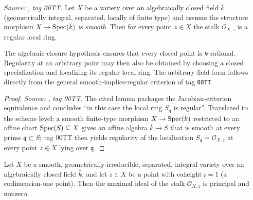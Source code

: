 \begin{lemma}\label{mk-lem:smooth_to_regular_local_ring}
  \leanok

  \textit{Source: \cite{stacks-project}, tag 00TT.}
  Let \(X\) be a variety over an algebraically closed field \(\bar k\) (geometrically
  integral, separated, locally of finite type) and assume the structure morphism
  \(X \to \operatorname{Spec}(\bar k)\) is \emph{smooth}. Then for every point \(z \in X\) the
  stalk \(\mathcal O_{X, z}\) is a regular local ring.

  The algebraic-closure hypothesis ensures that every closed point is
  \(\bar k\)-rational. Regularity at an arbitrary point may then also be obtained by
  choosing a closed specialization and localizing its regular local ring. The
  arbitrary-field form follows directly from the general smooth-implies-regular
  criterion of tag \texttt{00TT}.
\end{lemma}

\begin{proof}
  \textit{Source: \cite{stacks-project}, tag 00TT.} The cited lemma packages the
  Jacobian-criterion equivalence and concludes ``in this case the local ring
  \(S_{\mathfrak q}\) is regular''. Translated to the scheme level: a smooth
  finite-type morphism \(X \to \operatorname{Spec}(\bar k)\) restricted to an affine chart
  \(\operatorname{Spec}(S) \subseteq X\) gives an affine algebra \(\bar k \to S\) that is
  smooth at every prime \(\mathfrak q \subset S\); tag 00TT then yields
  regularity of the localisation \(S_{\mathfrak q} = \mathcal O_{X, z}\) at every
  point \(z \in X\) lying over \(\mathfrak q\).
\end{proof}

\begin{lemma}\label{mk-lem:smooth_codim_one_maximalIdeal_principal}
  \leanok

  Let \(X\) be a smooth, geometrically-irreducible, separated, integral variety over an
  algebraically closed field \(\bar k\), and let \(z \in X\) be a point with
  \(\mathrm{coheight}\,z = 1\) (a codimension-one point). Then the maximal ideal of the
  stalk \(\mathcal O_{X,z}\) is principal and nonzero.
\end{lemma}

